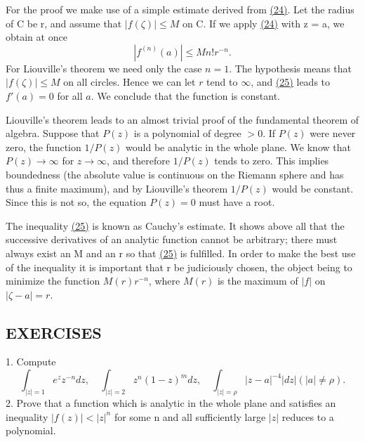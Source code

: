 For the proof we make use of a simple estimate derived from \hyperref[eq:4.24]{(24)}. Let the radius of C be r, and assume that $|f(\zeta)| \leq M$ on C. If we apply \hyperref[eq:4.24]{(24)} with z = a, we obtain at once
\begin{equation*}
\left| f ^ {(n)} (a) \right| \leq M n! r ^ {- n}.\tag{25}\label{eq:4.25}
\end{equation*}
For Liouville's theorem we need only the case $n = 1$. The hypothesis means that $|f(\zeta)| \leq M$ on all circles. Hence we can let $r$ tend to $\infty$, and \hyperref[eq:4.25]{(25)} leads to $f'(a) = 0$ for all $a$. We conclude that the function is constant.

Liouville's theorem leads to an almost trivial proof of the fundamental theorem of algebra. Suppose that $P(z)$ is a polynomial of degree $>0$. If $P(z)$ were never zero, the function $1 / P(z)$ would be analytic in the whole plane. We know that $P(z) \to \infty$ for $z \to \infty$, and therefore $1 / P(z)$ tends to zero. This implies boundedness (the absolute value is continuous on the Riemann sphere and has thus a finite maximum), and by Liouville's theorem $1 / P(z)$ would be constant. Since this is not so, the equation $P(z) = 0$ must have a root.

The inequality \hyperref[eq:4.25]{(25)} is known as Cauchy's estimate. It shows above
all that the successive derivatives of an analytic function cannot be arbitrary; there must always exist an M and an r so that \hyperref[eq:4.25]{(25)} is fulfilled. In order to make the best use of the inequality it is important that r be judiciously chosen, the object being to minimize the function $M(r)r^{-n}$, where $M(r)$ is the maximum of $|f|$ on $|\zeta - a| = r$.

\subsection*{EXERCISES}
1. Compute
\begin{equation*}
\int_ {| z | = 1} e ^ {z} z ^ {- n} d z, \quad \int_ {| z | = 2} z ^ {n} (1 - z) ^ {m} d z, \quad \int_ {| z | = \rho} | z - a | ^ {- 4} | d z | (| a | \neq \rho).
\end{equation*}
2. Prove that a function which is analytic in the whole plane and satisfies an inequality $|f(z)| < |z|^{n}$ for some n and all sufficiently large $|z|$ reduces to a polynomial.

